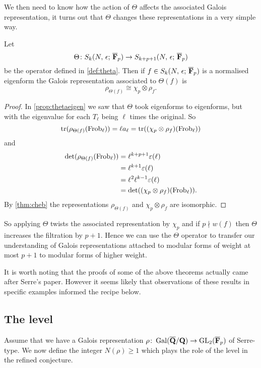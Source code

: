 \documentclass[a4paper,12pt]{article}
\begin{document}
We then need to know how the action of $\Theta$ affects the associated Galois representation, it turns out that $\Theta$ changes these representations in a very simple way.

\begin{prop}\label{prop:theta}
Let
\[
\Theta\colon S_k(N,\,\epsilon;\,\overline{\mathbf{F}}_p)\to S_{k+p+1}(N,\,\epsilon;\,\overline{\mathbf{F}}_p)
\]
be the operator defined in \cref{def:theta}.
Then if $f \in S_k(N,\,\epsilon;\,\overline{\mathbf{F}}_p)$ is a normalised eigenform the Galois representation associated to $\Theta(f)$ is
\[
\rho_{\Theta(f)} \cong \chi_p\otimes\rho_{f}.
\]
\end{prop}
\begin{proof}
In \cref{prop:thetaeigen} we saw that $\Theta$ took eigenforms to eigenforms, but with the eigenvalue for each $T_{\ell}$ being $\ell$ times the original.
So
\[
\operatorname{tr}(\rho_{\Theta(f)}(\operatorname{Frob}_\ell)) = \ell a_{\ell} = \operatorname{tr}((\chi_p \otimes \rho_{f})(\operatorname{Frob}_{\ell}))
\]
and
\begin{align*}
\det(\rho_{\Theta(f)}(\operatorname{Frob}_\ell)) &= \ell^{k+p+1}\varepsilon(\ell)\\
                                   &= \ell^{k+1}\varepsilon(\ell)\\
                                   &= \ell^2\ell^{k-1}\varepsilon(\ell)\\
                                   &= \det((\chi_p \otimes \rho_{f})(\operatorname{Frob}_{\ell})).
\end{align*}
By \cref{thm:cheb} the representations $\rho_{\Theta(f)}$ and $\chi_p \otimes \rho_{f}$ are isomorphic.
\end{proof}

So applying $\Theta$ twists the associated representation by $\chi_p$ and if $p\nmid w(f)$ then $\Theta$ increases the filtration by $p+1$.
Hence we can use the $\Theta$ operator to transfer our understanding of Galois representations attached to modular forms of weight at most $p+1$ to modular forms of higher weight.

It is worth noting that the proofs of some of the above theorems actually came after Serre's paper.
However it seems likely that observations of these results in specific examples informed the recipe below.


\subsection{The level}\label{subsec:level}
Assume that we have a Galois representation $\rho\colon \operatorname{Gal}(\overline{\mathbf{Q}}/\mathbf{Q}) \to \operatorname{GL}_2(\overline{\mathbf{F}}_p)$ of Serre-type.
We now define the integer $N(\rho) \ge 1$ which plays the role of the level in the refined conjecture.
\end{document}
